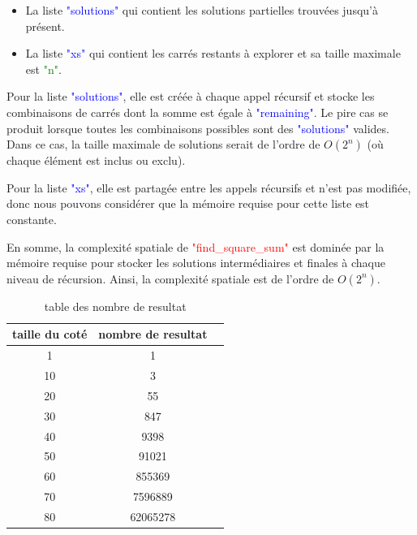 \documentclass{article}
\begin{document}
\begin{itemize}
  \item La liste \textcolor{blue}{"solutions"} qui contient les solutions partielles trouvées jusqu'à présent.
  \item La liste \textcolor{blue}{"xs"} qui contient les carrés restants à explorer et sa taille maximale est \textcolor{green}{"n"}.\newline
\end{itemize}

Pour la liste \textcolor{blue}{"solutions"}, elle est créée à chaque appel récursif et stocke les combinaisons de carrés dont la somme est égale à \textcolor{blue}{"remaining"}. Le pire cas se produit lorsque toutes les combinaisons possibles sont des \textcolor{blue}{"solutions"} valides. Dans ce cas, la taille maximale de solutions serait de l'ordre de $O(2^n)$ (où chaque élément est inclus ou exclu).\newline

Pour la liste \textcolor{blue}{"xs"}, elle est partagée entre les appels récursifs et n'est pas modifiée, donc nous pouvons considérer que la mémoire requise pour cette liste est constante.\newline

En somme, la complexité spatiale de \textcolor{red}{"find\_square\_sum"} est dominée par la mémoire requise pour stocker les solutions intermédiaires et finales à chaque niveau de récursion. Ainsi, la complexité spatiale est de l'ordre de $O(2^n)$.

\begin{table}[!ht]
    \centering
    \begin{tabular}{|c|c|c|}
    \hline
        taille du coté & nombre de resultat  \\ \hline
        1 & 1 \\ \hline
        10 & 3 \\ \hline
        20 & 55  \\ \hline
        30 & 847  \\ \hline
        40 & 9398  \\ \hline
        50 & 91021 \\ \hline
        60 & 855369  \\ \hline
        70 & 7596889  \\ \hline
        80 & 62065278  \\ \hline
    \end{tabular}
    \caption{table des nombre de resultat }
    \label{tab2}
\end{table}
\end{document}
